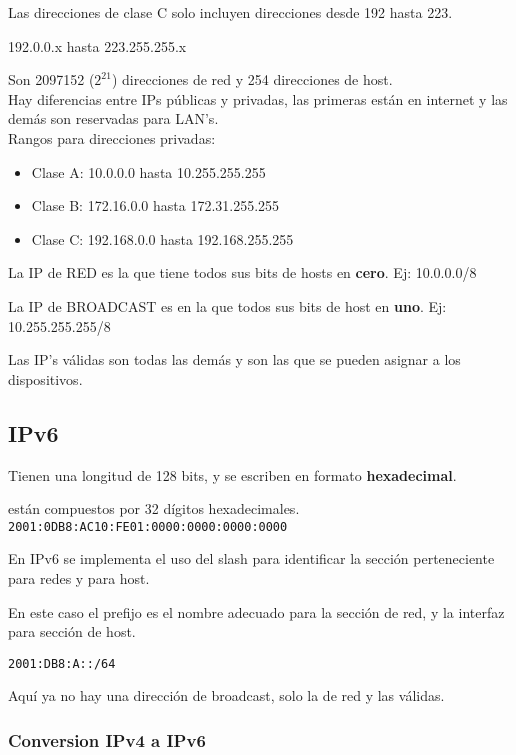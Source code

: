 Las direcciones de clase C solo incluyen direcciones desde 192 hasta 223. 

192.0.0.x hasta 223.255.255.x

Son 2097152 ($2^21$) direcciones de red y 254 direcciones de host. \\

Hay diferencias entre IPs públicas y privadas, las primeras están en internet y las demás son reservadas para LAN's.\\

Rangos para direcciones privadas:

\begin{itemize}
    \item Clase A: 10.0.0.0 hasta 10.255.255.255
    \item Clase B: 172.16.0.0 hasta 172.31.255.255
    \item Clase C: 192.168.0.0 hasta 192.168.255.255
\end{itemize}

 La IP de RED es la que tiene todos sus bits de hosts en \textbf{cero}. Ej: 10.0.0.0/8
 
 La IP de BROADCAST es en la que todos sus bits de host en \textbf{uno}. Ej: 10.255.255.255/8
 
 Las IP's válidas son todas las demás y son las que se pueden asignar a los dispositivos. 


\subsection{IPv6}

Tienen una longitud de 128 bits, y se escriben en formato \textbf{hexadecimal}.

están compuestos por 32 dígitos hexadecimales.\\

\texttt{2001:0DB8:AC10:FE01:0000:0000:0000:0000}

En IPv6 se implementa el uso del slash para identificar la sección perteneciente para redes y para host.

En este caso el prefijo es el nombre adecuado para la sección de red, y la interfaz para sección de host.

\texttt{2001:DB8:A::/64}

Aquí ya no hay una dirección de broadcast, solo la de red y las válidas.

\subsubsection{Conversion IPv4 a IPv6}

